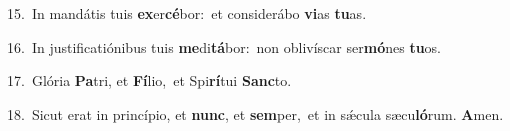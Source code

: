 {\numbfont\textcolor{\numbcolor}{15.}}~In mandátis tuis \textbf{ex}\-er\-\textbf{cé}\-bor:~\star et considerábo \textbf{vi}\-as \textbf{tu}\-as.\par
{\numbfont\textcolor{\numbcolor}{16.}}~In justificatiónibus tuis \textbf{me}\-di\-\textbf{tá}\-bor:~\star non oblivíscar ser\-\textbf{mó}\-nes \textbf{tu}\-os.\par
{\numbfont\textcolor{\numbcolor}{17.}}~Glória \textbf{Pa}\-tri, et \textbf{Fí}\-lio,~\star et Spi\-\textbf{rí}\-tui \textbf{Sanc}\-to.\par
{\numbfont\textcolor{\numbcolor}{18.}}~Sicut erat in princípio, et \textbf{nunc}\-, et \textbf{sem}\-per,~\star et in sǽcula sæcu\-\textbf{ló}\-rum. \textbf{A}\-men.\par
